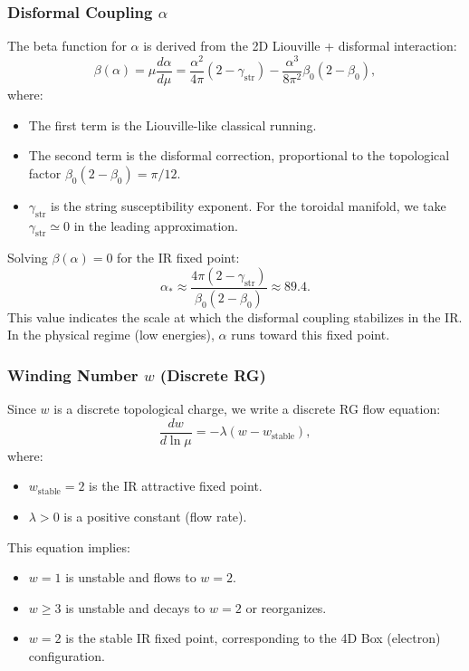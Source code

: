 \documentclass[11pt,a4paper]{article}
\begin{document}
\subsubsection{Disformal Coupling \(\alpha\)}
The beta function for \(\alpha\) is derived from the 2D Liouville + disformal interaction:
\begin{equation}
\beta (\alpha) = \mu \frac{d\alpha}{d\mu} = \frac{\alpha^2}{4\pi} (2 - \gamma_{\mathrm{str}}) - \frac{\alpha^3}{8\pi^2}\beta_0(2 - \beta_0), \tag{61}
\end{equation}
where:
\begin{itemize}
\item The first term is the Liouville-like classical running.
\item The second term is the disformal correction, proportional to the topological factor \(\beta_0(2 - \beta_0) = \pi /12\).
\item \(\gamma_{\mathrm{str}}\) is the string susceptibility exponent. For the toroidal manifold, we take \(\gamma_{\mathrm{str}}\simeq 0\) in the leading approximation.
\end{itemize}
Solving \(\beta (\alpha) = 0\) for the IR fixed point:
\begin{equation}
\alpha_{*} \approx \frac{4\pi(2 - \gamma_{\mathrm{str}})}{\beta_{0}(2 - \beta_{0})} \approx 89.4. \tag{62}
\end{equation}
This value indicates the scale at which the disformal coupling stabilizes in the IR. In the physical regime (low energies), \(\alpha\) runs toward this fixed point.

\subsubsection{Winding Number \(w\) (Discrete RG)}
Since \(w\) is a discrete topological charge, we write a discrete RG flow equation:
\begin{equation}
\frac{dw}{d\ln\mu} = -\lambda (w - w_{\mathrm{stable}}), \tag{63}
\end{equation}
where:
\begin{itemize}
\item \(w_{\mathrm{stable}} = 2\) is the IR attractive fixed point.
\item \(\lambda >0\) is a positive constant (flow rate).
\end{itemize}
This equation implies:
\begin{itemize}
\item \(w = 1\) is unstable and flows to \(w = 2\).
\item \(w \geq 3\) is unstable and decays to \(w = 2\) or reorganizes.
\item \(w = 2\) is the stable IR fixed point, corresponding to the 4D Box (electron) configuration.
\end{itemize}
\end{document}
